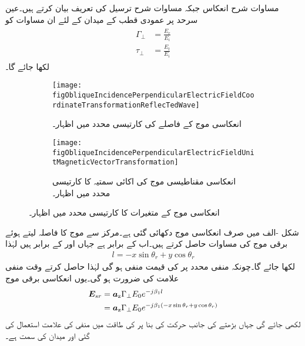 مساوات  شرح انعکاس جبکہ مساوات  شرح ترسیل کی تعریف بیان کرتے ہیں۔عین سرحد پر عمودی  قطب کے میدان کے لئے ان مساوات کو
\begin{gather}
\begin{aligned}\label{مساوات_ترچھی_سرحدی_شرائط}
\Gamma_{\perp}&=\frac{E_r}{E_i} \\
\tau_{\perp} &=\frac{E_t}{E_i}
\end{aligned}
\end{gather}
لکھا جائے گا۔
\begin{figure}
\centering
\begin{subfigure}{0.4\textwidth}
\centering
\texttt{[image: figObliqueIncidencePerpendicularElectricFieldCoordinateTransformationReflecTedWave]}
\caption{انعکاسی موج کے فاصلے کی کارتیسی محدد میں اظہار۔}
\label{شکل_ترچھی_انعکاسی_برقی}
\end{subfigure}%
\begin{subfigure}{0.4\textwidth}
\centering
\texttt{[image: figObliqueIncidencePerpendicularElectricFieldUnitMagneticVectorTransformation]}
\caption{انعکاسی مقناطیسی موج کی اکائی سمتیہ کا کارتیسی محدد میں اظہار۔}
\label{شکل_ترچھی_انعکاسی_مقناطیسی_اکائی}
\end{subfigure}%
\caption{انعکاسی موج کے متغیرات کا کارتیسی محدد میں اظہار۔}
\label{شکل_ترچھی_اکائی_اظہار}
\end{figure}

شکل -الف میں صرف انعکاسی  موج دکھائی گئی ہے۔مرکز  سے موج کا فاصلہ  لیتے ہوئے برقی موج کی مساوات حاصل کرتے ہیں۔اب  کے برابر ہے جہاں  اور  کے برابر ہیں لہٰذا
\begin{align}
l=-x \sin \theta_r+y\cos \theta_r
\end{align}
لکھا جائے گا۔چونکہ منفی محدد پر  کی قیمت منفی ہو گی لہٰذا  حاصل کرتے وقت منفی علامت کی ضرورت ہو گی۔یوں انعکاسی برقی موج
\begin{gather}
\begin{aligned} \label{مساوات_ترچھی_انعکاسی_برقی_میدان_دوری_سمتی}
{\ensuremath{{\boldsymbol{E}}}}_{sr}&={\boldsymbol{a}}_{\textup{z}} \Gamma_{\perp} E_0 e^{- j \beta_1 l}\\
&={\boldsymbol{a}}_{\textup{z}} \Gamma_{\perp} E_0 e^{- j \beta_1 (-x \sin \theta_r+y\cos \theta_r)}
\end{aligned}
\end{gather}
لکھی جائے گی جہاں بڑھتے  کی جانب حرکت کی بنا پر  کی طاقت میں منفی کی علامت استعمال کی گئی اور میدان کی سمت  ہے۔


